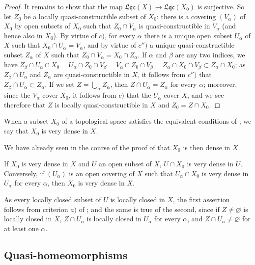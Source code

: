 \begin{proof}
It remains to show that the map $\mathfrak{Lqc}(X)\to\mathfrak{Lqc}(X_0)$ is surjective.
So let $Z_0$ be a locally quasi-constructible subset of $X_0$: there is a covering $(V_\alpha)$ of $X_0$ by open subsets of $X_0$ such that $Z_0\cap V_\alpha$ is quasi-constructible in $V_\alpha$ (and
hence also in $X_0$).
By virtue of $c)$, for every $\alpha$ there is a unique open subset $U_\alpha$ of $X$ such that $X_0\cap U_\alpha=V_\alpha$, and by virtue of $c'')$ a unique quasi-constructible subset $Z_\alpha$ of $X$ such that $Z_0\cap V_\alpha=X_0\cap Z_\alpha$.
If $\alpha$ and $\beta$ are any two indices, we have $Z_\beta\cap U_\alpha\cap X_0=U_\alpha\cap Z_0\cap V_\beta=V_\alpha\cap Z_0\cap V_\beta=Z_\alpha\cap X_0\cap V_\beta\subset Z_\alpha\cap X_0$; as $Z_\beta\cap U_\alpha$ and $Z_\alpha$ are quasi-constructible in $X$, it follows from $c'')$ that $Z_\beta\cap U_\alpha\subset Z_\alpha$.
If we set $Z=\bigcup_\alpha Z_\alpha$, then $Z\cap U_\alpha=Z_\alpha$ for every $\alpha$; moreover, since the $V_\alpha$ cover $X_0$, it follows from $c)$ that the $U_\alpha$ cover $X$, and we see therefore that $Z$ is locally quasi-constructible in $X$ and $Z_0=Z\cap X_0$.
\end{proof}

\begin{definition}[10.1.3]
\label{IV.10.1.3}
When a subset $X_0$ of a topological space satisfies the equivalent conditions of , we say that $X_0$ is very dense in $X$.
\end{definition}

We have already seen in the course of the proof of  that $X_0$ is then dense in $X$.

\begin{corollary}[10.1.4]
\label{IV.10.1.4}
If $X_0$ is very dense in $X$ and $U$ an open subset of $X$, $U\cap X_0$ is very dense in $U$.
Conversely, if $(U_\alpha)$ is an open covering of $X$ such that $U_\alpha\cap X_0$ is very dense in $U_\alpha$ for every $\alpha$, then $X_0$ is very dense in $X$.
\end{corollary}

As every locally closed subset of $U$ is locally closed in $X$, the first assertion follows from criterion $a)$ of ; and the same is true of the second, since if $Z\neq\varnothing$ is locally closed in $X$, $Z\cap U_\alpha$ is locally closed in $U_\alpha$ for every $\alpha$, and $Z\cap U_\alpha\neq\varnothing$ for at least one $\alpha$.

\subsection{Quasi-homeomorphisms}
\label{subsection:IV.10.2}


